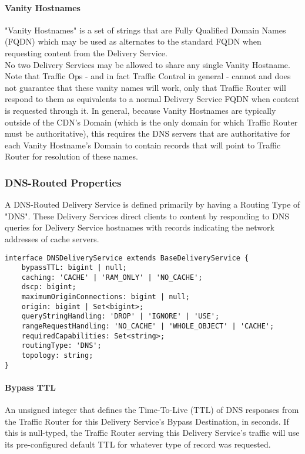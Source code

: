 \paragraph{Vanity Hostnames}
"Vanity Hostnames" is a set of strings that are Fully Qualified Domain Names
(FQDN) which may be used as alternates to the standard
 FQDN when requesting
content from the Delivery Service.\\
No two Delivery Services may be allowed to share any single Vanity Hostname.\\
Note that Traffic Ops - and in fact Traffic Control in general - cannot and
does not guarantee that these vanity names will work, only that Traffic Router
will respond to them as equivalents to a normal Delivery Service FQDN when
content is requested through it. In general, because Vanity Hostnames are
typically outside of the CDN's Domain (which is the only domain for which
Traffic Router must be authoritative), this requires the DNS servers that are
authoritative for each Vanity Hostname's Domain to contain records that will
point to Traffic Router for resolution of these names.

\subsubsection{DNS-Routed Properties}
A DNS-Routed Delivery Service is defined primarily by having a Routing Type of
"DNS". These Delivery Services direct clients to content by responding to DNS
queries for Delivery Service hostnames with records indicating the network
addresses of cache servers.

\begin{codelisting}
\begin{verbatim}
interface DNSDeliveryService extends BaseDeliveryService {
	bypassTTL: bigint | null;
	caching: 'CACHE' | 'RAM_ONLY' | 'NO_CACHE';
	dscp: bigint;
	maximumOriginConnections: bigint | null;
	origin: bigint | Set<bigint>;
	queryStringHandling: 'DROP' | 'IGNORE' | 'USE';
	rangeRequestHandling: 'NO_CACHE' | 'WHOLE_OBJECT' | 'CACHE';
	requiredCapabilities: Set<string>;
	routingType: 'DNS';
	topology: string;
}
\end{verbatim}
\end{codelisting}

\paragraph{Bypass TTL}
An unsigned integer that defines the Time-To-Live (TTL) of DNS responses from
the Traffic Router for this Delivery Service's Bypass Destination, in seconds.
If this is null-typed, the Traffic Router serving this Delivery Service's
traffic will use its pre-configured default TTL for whatever type of record was
requested.

